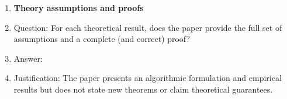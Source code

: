 \begin{enumerate}
\item {\bf Theory assumptions and proofs}
    \item[] Question: For each theoretical result, does the paper provide the full set of assumptions and a complete (and correct) proof?
    \item[] Answer: \answerNA{}
    \item[] Justification: The paper presents an algorithmic formulation and
    empirical results but does not state new theorems or claim theoretical guarantees.


\end{enumerate}
